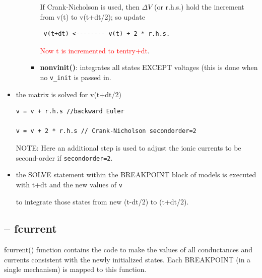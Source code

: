 \begin{itemize}
\begin{enumerate}
\begin{itemize}
 If Crank-Nicholson is used, then $\Delta V$ (or r.h.s.) hold the
 increment from v(t) to v(t+dt/2); so update 
 
 \begin{verbatim}
 v(t+dt) <-------- v(t) + 2 * r.h.s.
 \end{verbatim}

\textcolor{red}{Now t is incremented to tentry+dt}.

      \item {\bf nonvinit()}: integrates all states EXCEPT voltages (this is
      done when no \verb!v_init! is passed in.

       
      \end{itemize}
  \end{enumerate} 
  
  
%   
   
  
  \item the matrix is solved for v(t+dt/2)

\begin{verbatim}
v = v + r.h.s //backward Euler

v = v + 2 * r.h.s // Crank-Nicholson secondorder=2
\end{verbatim}  

 NOTE: Here an additional step is used to adjust the ionic currents to be
 second-order if \verb!secondorder=2!. 
 
  \item the SOLVE statement within the BREAKPOINT block of models is executed
  with t+dt and the new values of \verb!v! 
  
  to integrate those states from new (t-dt/2) to (t+dt/2).
   
\end{itemize}

\subsection{-- fcurrent}
\label{sec:fcurrent-NEURON}

fcurrent() function contains the code to make the values of all conductances and
currents consistent with the newly initialized states.
Each BREAKPOINT (in a single mechanism) is mapped to this function.


